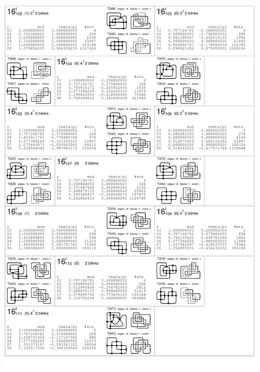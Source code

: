 \begin{center}
 \includegraphics[height=23.5cm]{E.figsbw2/con3catalog025_bw.pdf} \eject

\end{center}
